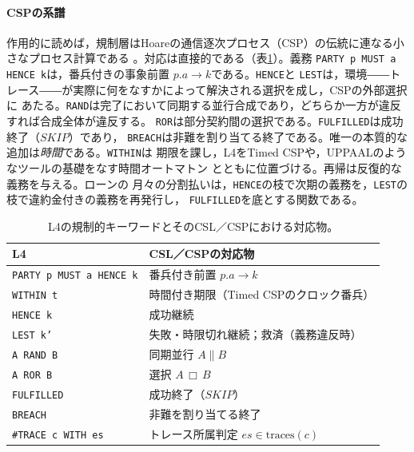 \documentclass[11pt,a4paper]{ltjsarticle}
\newcommand{\code}[1]{\texttt{\small #1}}
\begin{document}
\paragraph{CSPの系譜}
作用的に読めば，規制層はHoareの通信逐次プロセス（CSP）の伝統に連なる小さなプロセス計算である
\cite{hoare1978csp,hoare1985csp,roscoe1997theory}。対応は直接的である（表\ref{tab:csp}）。義務
\code{PARTY p MUST a HENCE k}は，番兵付きの事象前置 $p.a \rightarrow k$である。\code{HENCE}と
\code{LEST}は，環境――トレース――が実際に何をなすかによって解決される選択を成し，CSPの外部選択に
あたる。\code{RAND}は完了において同期する並行合成であり，どちらか一方が違反すれば合成全体が違反する。
\code{ROR}は部分契約間の選択である。\code{FULFILLED}は成功終了（$\mathit{SKIP}$）であり，
\code{BREACH}は非難を割り当てる終了である。唯一の本質的な追加は\emph{時間}である。\code{WITHIN}は
期限を課し，L4をTimed CSP\cite{reed1988timedcsp}や，UPPAALのようなツールの基礎をなす時間オートマトン
\cite{alur1994timed,behrmann2004uppaal}とともに位置づける。再帰は反復的な義務を与える。ローンの
月々の分割払いは，\code{HENCE}の枝で次期の義務を，\code{LEST}の枝で違約金付きの義務を再発行し，
\code{FULFILLED}を底とする関数である。

\begin{table}[t]
\caption{L4の規制的キーワードとそのCSL／CSPにおける対応物。}
\label{tab:csp}
\small
\begin{tabular}{@{}ll@{}}
\toprule
\textbf{L4} & \textbf{CSL／CSPの対応物} \\
\midrule
\code{PARTY p MUST a HENCE k} & 番兵付き前置 $p.a \rightarrow k$ \\
\code{WITHIN t}               & 時間付き期限（Timed CSPのクロック番兵） \\
\code{HENCE k}                & 成功継続 \\
\code{LEST k'}                & 失敗・時限切れ継続；救済（義務違反時） \\
\code{A RAND B}               & 同期並行 $A \parallel B$ \\
\code{A ROR B}                & 選択 $A \,\Box\, B$ \\
\code{FULFILLED}              & 成功終了（$\mathit{SKIP}$） \\
\code{BREACH}                 & 非難を割り当てる終了 \\
\code{\#TRACE c WITH es}      & トレース所属判定 $es \in \mathrm{traces}(c)$ \\
\bottomrule
\end{tabular}
\end{table}
\end{document}
